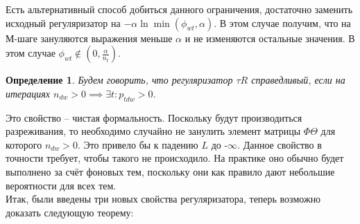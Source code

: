 \documentclass[12pt]{article}
\newtheorem{definition}{Определение}[section]
\begin{document}
Есть альтернативный способ добиться данного ограничения, достаточно заменить исходный регуляризатор на $-\alpha \ln \min(\phi_{wt}, \alpha)$. В этом случае получим, что на М-шаге зануляются выражения меньше $\alpha$ и не изменяются остальные значения. В этом случае $\phi_{wt}\notin (0, \frac{\alpha}{n_t})$.
\begin{definition}
Будем говорить, что регуляризатор $\tau R$ справедливый, если на итерациях $n_{dw} > 0 \implies \exists t\colon p_{tdw} > 0$.
\end{definition}
Это свойство -- чистая формальность. Поскольку будут производиться разреживания, то необходимо случайно не занулить элемент матрицы $\Phi \Theta$ для которого $n_{dw} > 0$. Это привело бы к падению $L$ до -$\infty$.  Данное свойство в точности требует, чтобы такого не происходило. На практике оно обычно будет выполнено за счёт фоновых тем\cite{artmdef2}, поскольку они как правило дают небольшие вероятности для всех тем.\\
Итак, были введены три новых свойства регуляризатора, теперь возможно доказать следующую теорему:
\end{document}
